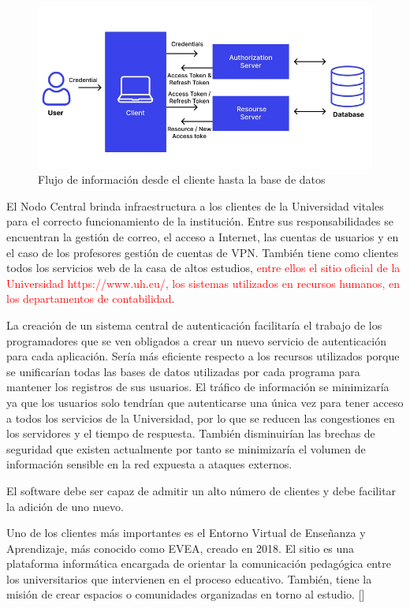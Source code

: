 \begin{figure}[H]
	\centering
	\includegraphics[width=0.9\linewidth]{Graphics/token-based-auth}
	\caption{Flujo de información desde el cliente hasta la base de datos}
	\label{fig:token-based-auth}
\end{figure}

El Nodo Central brinda infraestructura a los clientes de la Universidad vitales para el correcto funcionamiento de la institución. Entre sus responsabilidades se encuentran la gestión de correo, el acceso a Internet, las cuentas de usuarios y en el caso de los profesores gestión de cuentas de VPN. También tiene como clientes todos los servicios web de la casa de altos estudios, \textcolor{red}{entre ellos el sitio oficial de la Universidad https://www.uh.cu/, los sistemas utilizados en recursos humanos, en los departamentos de contabilidad}.

La creación de un sistema central de autenticación facilitaría el trabajo de los programadores que se ven obligados a crear un nuevo servicio de autenticación para cada aplicación. Sería más eficiente respecto a los recursos utilizados porque se unificarían todas las bases de datos utilizadas por cada programa para mantener los registros de sus usuarios. El tráfico de información se minimizaría ya que los usuarios solo tendrían que autenticarse una única vez para tener acceso a todos los servicios de la Universidad, por lo que se reducen las congestiones en los servidores y el tiempo de respuesta. También disminuirían las brechas de seguridad que existen actualmente por tanto se minimizaría el volumen de información sensible en la red expuesta a ataques externos.

El software debe ser capaz de admitir un alto número de clientes y debe facilitar la adición de uno nuevo.

Uno de los clientes más importantes es el Entorno Virtual de Enseñanza y Aprendizaje, más conocido como EVEA, creado en 2018. El sitio es una plataforma informática encargada de orientar la comunicación pedagógica entre los universitarios que intervienen en el proceso educativo. También, tiene la misión de crear espacios o comunidades organizadas en torno al estudio. [\cite{evea-cd}] 

